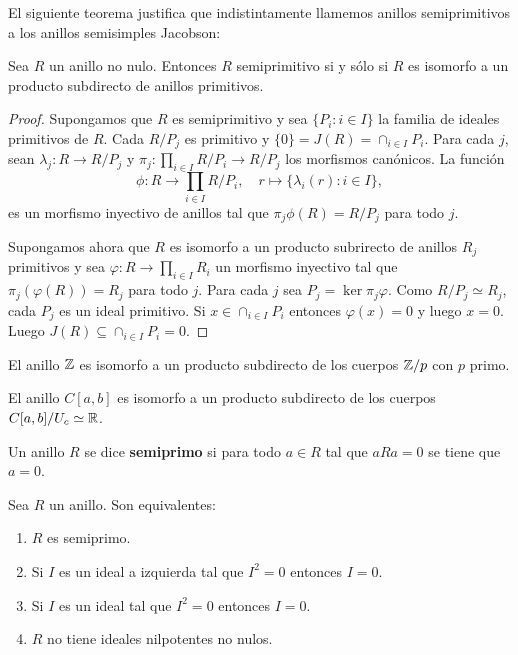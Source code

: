 El siguiente teorema justifica que indistintamente llamemos anillos
semiprimitivos a los anillos semisimples Jacobson:

\begin{theorem}
	\label{thm:subdirecto}
	Sea $R$ un anillo no nulo. Entonces $R$ semiprimitivo si y sólo si $R$ es
	isomorfo a un producto subdirecto de anillos primitivos.
\end{theorem}

\begin{proof}
	Supongamos que $R$ es semiprimitivo y sea $\{P_i:i\in I\}$ la familia de
	ideales primitivos de $R$. Cada $R/P_j$ es primitivo y
	$\{0\}=J(R)=\cap_{i\in I}P_i$. Para cada $j$, sean $\lambda_j\colon R\to
	R/P_j$ y $\pi_j\colon \prod_{i\in I}R/P_i\to R/P_j$ los morfismos
	canónicos. La función
	\[
		\phi\colon R\to\prod_{i\in I}R/P_i,\quad
		r\mapsto \{\lambda_i(r):i\in I\},
	\]
	es un morfismo inyectivo de anillos tal que $\pi_j\phi(R)=R/P_j$ para todo
	$j$.

	Supongamos ahora que $R$ es isomorfo a un producto subrirecto de anillos
	$R_j$ primitivos y sea $\varphi\colon R\to\prod_{i\in I}R_i$ un morfismo
	inyectivo tal que $\pi_j(\varphi(R))=R_j$ para todo $j$. Para cada $j$ sea
	$P_j=\ker\pi_j\varphi$. Como $R/P_j\simeq R_j$, cada $P_j$ es un ideal
	primitivo. Si $x\in\cap_{i\in I}P_i$ entonces $\varphi(x)=0$ y luego $x=0$.
	Luego $J(R)\subseteq\cap_{i\in I} P_i=0$. 
\end{proof}

\begin{example}
	El anillo $\mathbb{Z}$ es isomorfo a un producto subdirecto de los cuerpos $\mathbb{Z}/p$
	con $p$ primo.
\end{example}

\begin{example}
	El anillo $C[a,b]$ es isomorfo a un producto subdirecto de los cuerpos
	$C[a,b]/U_c\simeq\mathbb{R}$.
\end{example}

\begin{definition}
	Un anillo $R$ se dice \textbf{semiprimo} si para todo $a\in R$ tal que
	$aRa=0$ se tiene que $a=0$.
\end{definition}

\begin{lemma}
	Sea $R$ un anillo. Son equivalentes:
	\begin{enumerate}
		\item $R$ es semiprimo.
		\item Si $I$ es un ideal a izquierda tal que $I^2=0$ entonces $I=0$.
		\item Si $I$ es un ideal tal que $I^2=0$ entonces $I=0$.
		\item $R$ no tiene ideales nilpotentes no nulos. 
	\end{enumerate}
\end{lemma}

